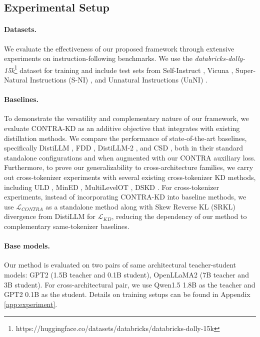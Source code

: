 \documentclass{article} %
\theoremstyle{definition}
\theoremstyle{remark}
\begin{document}
\subsection{Experimental Setup}
\label{sec:exp_setup}
\paragraph{Datasets.} We evaluate the effectiveness of our proposed framework through extensive experiments on instruction-following benchmarks. We use the \textit{databricks-dolly-15k}\footnote{https://huggingface.co/datasets/databricks/databricks-dolly-15k} dataset for training and include test sets from Self-Instruct \cite{wang2023selfinstructaligninglanguagemodels}, Vicuna \cite{vicuna2023}, Super-Natural Instructions (S-NI) \cite{wang2022supernaturalinstructionsgeneralizationdeclarativeinstructions}, and Unnatural Instructions (UnNI) \cite{honovich2022unnaturalinstructionstuninglanguage}.

\paragraph{Baselines.} To demonstrate the versatility and complementary nature of our framework, we evaluate CONTRA-KD as an additive objective that integrates with existing distillation methods. We compare the performance of state-of-the-art baselines, specifically DistiLLM \cite{ko2024distillmstreamlineddistillationlarge}, FDD \cite{gong-etal-2025-beyond}, DistiLLM-2 \cite{ko2025distillm2contrastiveapproachboosts}, and CSD \cite{kim2026distillationlargelanguagemodels}, both in their standard standalone configurations and when augmented with our CONTRA auxiliary loss. Furthermore, to prove our generalizability to cross-architecture families, we carry out cross-tokenizer experiments with several existing cross-tokenizer KD methods, including ULD \cite{boizard2025crosstokenizerdistillationuniversallogit}, MinED \cite{Wan2024KnowledgeFO}, MultiLevelOT \cite{cui2025multileveloptimaltransportuniversal}, DSKD \cite{zhang2024dualspaceknowledgedistillationlarge}. For cross-tokenizer experiments, instead of incorporating CONTRA-KD into baseline methods, we use $\mathcal{L}_{CONTRA}$ as a standalone method along with Skew Reverse KL (SRKL) divergence from DistiLLM for $\mathcal{L}_{KD}$, reducing the dependency of our method to complementary same-tokenizer baselines.


\paragraph{Base models.}
Our method is evaluated on two pairs of same architectural teacher-student models: GPT2 \cite{radford2019language} (1.5B teacher and 0.1B student), OpenLLaMA2 \cite{openlm2023openllama} (7B teacher and 3B student). For cross-architectural pair, we use Qwen1.5 1.8B as the teacher and GPT2 0.1B as the student. Details on training setups can be found in Appendix \ref{app:experiment}.
\end{document}
